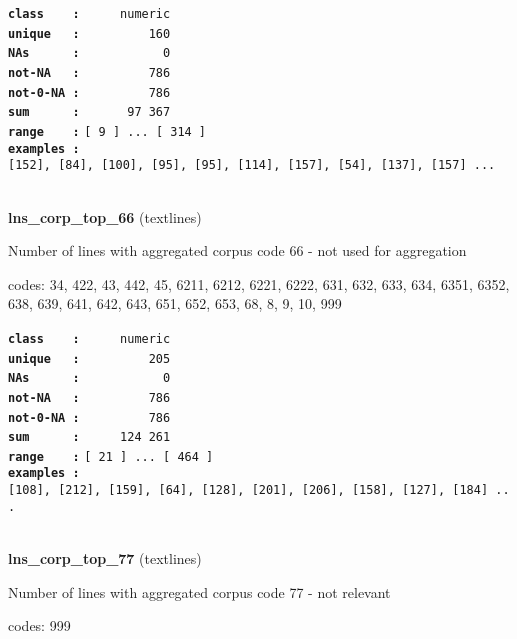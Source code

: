 \documentclass[]{article}
\begin{document}
\textbf{\texttt{class\ \ \ \ :}} \texttt{~~~~~numeric}\\
\textbf{\texttt{unique\ \ \ :}} \texttt{~~~~~~~~~160}\\
\textbf{\texttt{NAs\ \ \ \ \ \ :}} \texttt{~~~~~~~~~~~0}\\
\textbf{\texttt{not-NA\ \ \ :}} \texttt{~~~~~~~~~786}\\
\textbf{\texttt{not-0-NA\ :}} \texttt{~~~~~~~~~786}\\
\textbf{\texttt{sum\ \ \ \ \ \ :}} \texttt{~~~~~~97~367}\\
\textbf{\texttt{range\ \ \ \ :}}
\texttt{{[}\ 9\ {]}\ ...\ {[}\ 314\ {]}}\\
\textbf{\texttt{examples\ :}}
\texttt{{[}152{]},\ {[}84{]},\ {[}100{]},\ {[}95{]},\ {[}95{]},\ {[}114{]},\ {[}157{]},\ {[}54{]},\ {[}137{]},\ {[}157{]}\ ...}\\

~

\textbf{lns\_corp\_top\_66} (textlines)

Number of lines with aggregated corpus code 66 - not used for
aggregation

codes: 34, 422, 43, 442, 45, 6211, 6212, 6221, 6222, 631, 632, 633, 634,
6351, 6352, 638, 639, 641, 642, 643, 651, 652, 653, 68, 8, 9, 10, 999

\textbf{\texttt{class\ \ \ \ :}} \texttt{~~~~~numeric}\\
\textbf{\texttt{unique\ \ \ :}} \texttt{~~~~~~~~~205}\\
\textbf{\texttt{NAs\ \ \ \ \ \ :}} \texttt{~~~~~~~~~~~0}\\
\textbf{\texttt{not-NA\ \ \ :}} \texttt{~~~~~~~~~786}\\
\textbf{\texttt{not-0-NA\ :}} \texttt{~~~~~~~~~786}\\
\textbf{\texttt{sum\ \ \ \ \ \ :}} \texttt{~~~~~124~261}\\
\textbf{\texttt{range\ \ \ \ :}}
\texttt{{[}\ 21\ {]}\ ...\ {[}\ 464\ {]}}\\
\textbf{\texttt{examples\ :}}
\texttt{{[}108{]},\ {[}212{]},\ {[}159{]},\ {[}64{]},\ {[}128{]},\ {[}201{]},\ {[}206{]},\ {[}158{]},\ {[}127{]},\ {[}184{]}\ ...}\\

~

\textbf{lns\_corp\_top\_77} (textlines)

Number of lines with aggregated corpus code 77 - not relevant

codes: 999
\end{document}
